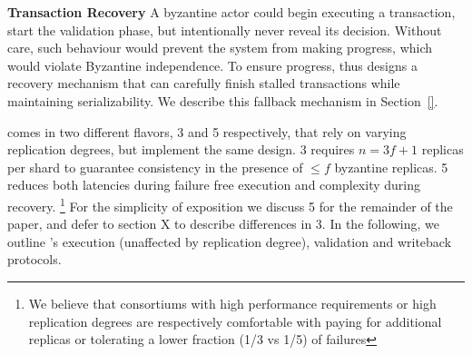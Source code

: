 \par \textbf{Transaction Recovery} A byzantine actor could begin executing a transaction, start the validation phase, but intentionally never reveal its decision. Without care,
such behaviour would prevent the system from making progress, which would violate Byzantine independence. To ensure progress, \sys{} thus designs a recovery mechanism that can 
carefully finish stalled transactions while maintaining serializability. We describe this fallback mechanism in Section~\ref{}.

\iffalse
{}
\sys comes in two different flavors, \sys{}3 and \sys{}5 respectively, that rely on varying replication degrees, but implement the same design. \sys{}3 requires $n=3f+1$ replicas  per shard to guarantee consistency in the presence of $\leq f$ byzantine replicas. \sys{}5 reduces both latencies during failure free execution and complexity during recovery. \footnote{We believe that consortiums with high performance requirements or high replication degrees are respectively comfortable with paying for additional replicas or tolerating a lower fraction (1/3 vs 1/5) of failures}
For the simplicity of exposition we discuss \sys{}5 for the remainder of the paper, and defer to section X  to describe differences in \sys{}3. In the following, we outline \sys 's execution (unaffected by replication degree), validation and writeback protocols.

